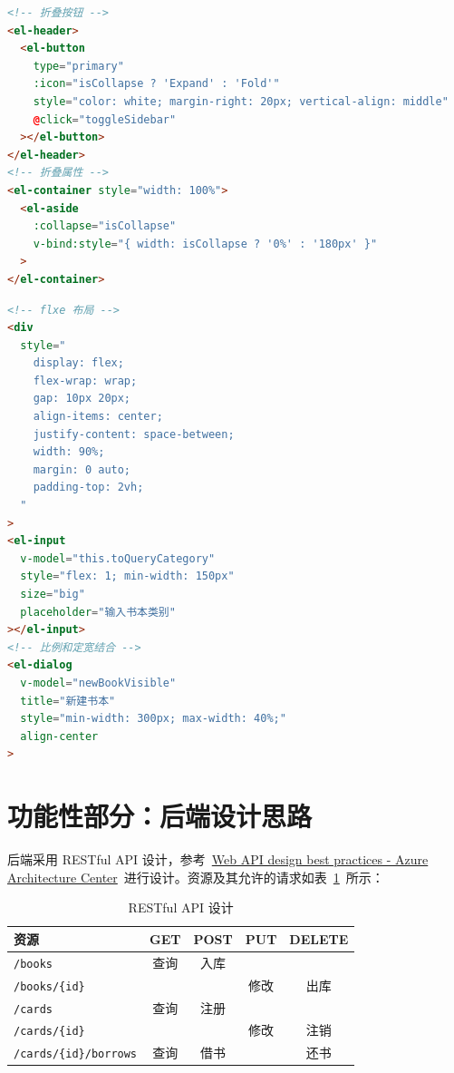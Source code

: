 \documentclass[a4paper,oneside]{ctexbook}
\begin{document}
\begin{lstlisting}[language=HTML, caption=App.vue,label=lst:fold]
<!-- 折叠按钮 -->
<el-header> 
  <el-button
    type="primary"
    :icon="isCollapse ? 'Expand' : 'Fold'"
    style="color: white; margin-right: 20px; vertical-align: middle"
    @click="toggleSidebar"
  ></el-button>
</el-header>
<!-- 折叠属性 -->
<el-container style="width: 100%">
  <el-aside
    :collapse="isCollapse"
    v-bind:style="{ width: isCollapse ? '0%' : '180px' }"
  >
</el-container>
\end{lstlisting}

\begin{lstlisting}[language=HTML, caption=Book.vue,label=lst:css]
<!-- flxe 布局 -->
<div
  style="
    display: flex;
    flex-wrap: wrap;
    gap: 10px 20px;
    align-items: center;
    justify-content: space-between;
    width: 90%;
    margin: 0 auto;
    padding-top: 2vh;
  "
>
<el-input
  v-model="this.toQueryCategory"
  style="flex: 1; min-width: 150px"
  size="big"
  placeholder="输入书本类别"
></el-input>
<!-- 比例和定宽结合 -->
<el-dialog
  v-model="newBookVisible"
  title="新建书本"
  style="min-width: 300px; max-width: 40%;"
  align-center
>
\end{lstlisting}

\section{功能性部分：后端设计思路}

后端采用 RESTful API 设计，参考~\href{https://learn.microsoft.com/en-us/azure/architecture/best-practices/api-design}{Web API design best practices - Azure Architecture Center}~进行设计。资源及其允许的请求如表~\ref{tab:restful}~所示：

\begin{table}[h!]
    \caption{RESTful API 设计}
    \centering
    \label{tab:restful}
    \begin{tabular}{lcccc}
        \toprule
        资源 & GET & POST & PUT & DELETE \\
        \midrule
        \verb|/books| & 查询 & 入库 & & \\
        \verb|/books/{id}| & & & 修改 & 出库 \\
        \verb|/cards| & 查询 & 注册 & & \\
        \verb|/cards/{id}| & & & 修改 & 注销 \\
        \verb|/cards/{id}/borrows| & 查询 & 借书 & & 还书\\
        \bottomrule
    \end{tabular}
\end{table}
\end{document}
